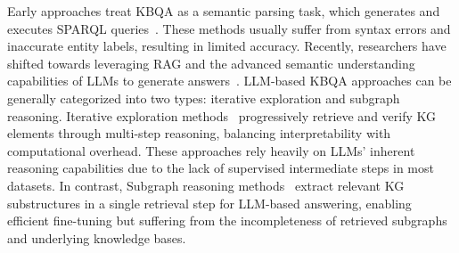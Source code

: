 Early approaches treat KBQA as a semantic parsing task, which generates and executes SPARQL queries~\cite{lan-jiang-2020-query,SPARQL2021,KD-CoT}. These methods usually suffer from syntax errors and inaccurate entity labels, resulting in limited accuracy. Recently, researchers have shifted towards  leveraging RAG and the advanced semantic understanding capabilities of LLMs to generate answers~\cite{RRA}. LLM-based KBQA approaches can be generally categorized into two types: iterative exploration and subgraph reasoning. Iterative exploration methods~\cite{ToG,ToG2,ToG-I,KG-CoT,PoG,FiDeLiS,GoG,KARPA,Paths-over-Graph,BeamRetrieval,DoG} progressively retrieve and verify KG elements through multi-step reasoning, balancing interpretability with computational overhead. These approaches rely heavily on LLMs' inherent reasoning capabilities due to the lack of supervised intermediate steps in most datasets. In contrast, Subgraph reasoning methods~\cite{RoG,GNN-RAG,SubgraphRAG,READS,GCR} extract relevant KG substructures in a single retrieval step for LLM-based answering, enabling efficient fine-tuning but suffering from the incompleteness of retrieved subgraphs and underlying knowledge bases.
